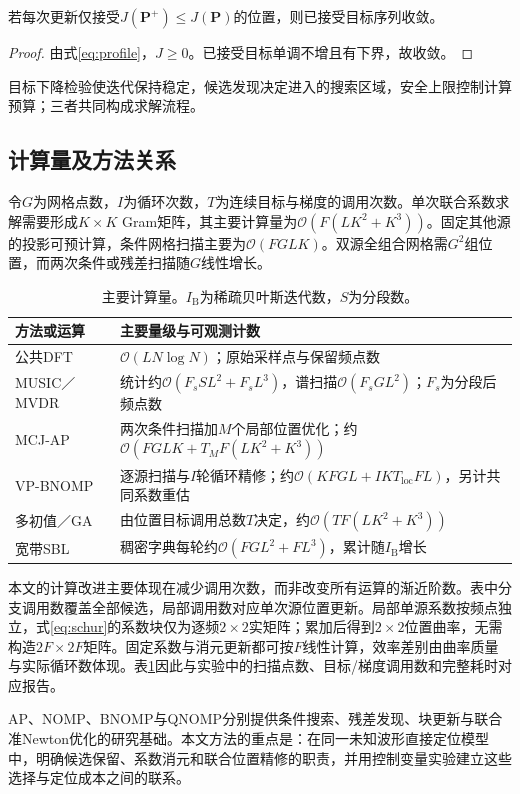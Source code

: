\begin{proposition}[已接受目标的单调性]
若每次更新仅接受$J(\bm P^{+})\le J(\bm P)$的位置，则已接受目标序列收敛。
\end{proposition}
\begin{proof}
由式\eqref{eq:profile}，$J\ge0$。已接受目标单调不增且有下界，故收敛。
\end{proof}
目标下降检验使迭代保持稳定，候选发现决定进入的搜索区域，安全上限控制计算预算；三者共同构成求解流程。

\subsection{计算量及方法关系}\label{sec:complexity}
令$G$为网格点数，$I$为循环次数，$T$为连续目标与梯度的调用次数。单次联合系数求解需要形成$K\times K$ Gram矩阵，其主要计算量为$\mathcal O(F(LK^2+K^3))$。固定其他源的投影可预计算，条件网格扫描主要为$\mathcal O(FGLK)$。双源全组合网格需$G^2$组位置，而两次条件或残差扫描随$G$线性增长。

\begin{table}[t]
\centering\small
\caption{主要计算量。$I_{\mathrm B}$为稀疏贝叶斯迭代数，$S$为分段数。}\label{tab:complexity}
\begin{tabularx}{\linewidth}{@{}lX@{}}\toprule
方法或运算 & 主要量级与可观测计数\\\midrule
公共DFT & $\mathcal O(LN\log N)$；原始采样点与保留频点数\\
MUSIC／MVDR & 统计约$\mathcal O(F_sSL^2+F_sL^3)$，谱扫描$\mathcal O(F_sGL^2)$；$F_s$为分段后频点数\\
MCJ-AP & 两次条件扫描加$M$个局部位置优化；约$\mathcal O(FGLK+T_MF(LK^2+K^3))$\\
VP-BNOMP & 逐源扫描与$I$轮循环精修；约$\mathcal O(KFGL+IKT_{\mathrm{loc}}FL)$，另计共同系数重估\\
多初值／GA & 由位置目标调用总数$T$决定，约$\mathcal O(TF(LK^2+K^3))$\\
宽带SBL & 稠密字典每轮约$\mathcal O(FGL^2+FL^3)$，累计随$I_{\mathrm B}$增长\\\bottomrule
\end{tabularx}
\end{table}
本文的计算改进主要体现在减少调用次数，而非改变所有运算的渐近阶数。表中分支调用数覆盖全部候选，局部调用数对应单次源位置更新。局部单源系数按频点独立，式\eqref{eq:schur}的系数块仅为逐频$2\times2$实矩阵；累加后得到$2\times2$位置曲率，无需构造$2F\times2F$矩阵。固定系数与消元更新都可按$F$线性计算，效率差别由曲率质量与实际循环数体现。表\ref{tab:complexity}因此与实验中的扫描点数、目标/梯度调用数和完整耗时对应报告。

AP、NOMP、BNOMP与QNOMP分别提供条件搜索、残差发现、块更新与联合准Newton优化的研究基础\cite{ChenHudsonYao2002,Mamandipoor2016,Yang2022,Zeng2025}。本文方法的重点是：在同一未知波形直接定位模型中，明确候选保留、系数消元和联合位置精修的职责，并用控制变量实验建立这些选择与定位成本之间的联系。
